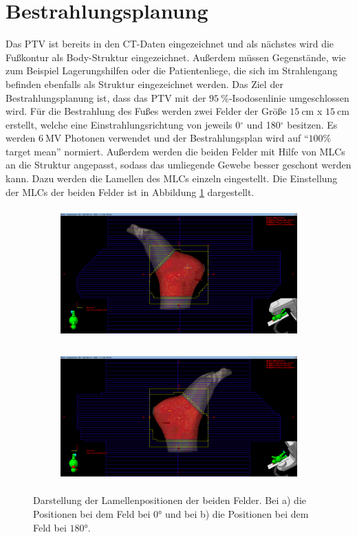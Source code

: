 \section{Bestrahlungsplanung}
\label{sec:Bestrahlungsplanung}
Das PTV ist bereits in den CT-Daten eingezeichnet und als nächstes wird die Fußkontur als Body-Struktur eingezeichnet.
Außerdem müssen Gegenstände, wie zum Beispiel Lagerungshilfen oder die Patientenliege, die sich im Strahlengang befinden
ebenfalls als Struktur eingezeichnet werden. Das Ziel der Bestrahlungsplanung ist, dass das PTV mit der
$\SI{95}{\percent}$-Isodosenlinie umgeschlossen wird.
Für die Bestrahlung des Fußes werden zwei Felder der Größe $\SI{15}{\centi\meter}$ x $\SI{15}{\centi\meter}$ erstellt,
welche eine Einstrahlungsrichtung von jeweils 0$^\circ$ und 180$^\circ$ besitzen.
Es werden $\SI{6}{\mega\volt}$ Photonen verwendet und der Bestrahlungsplan wird auf \enquote{$100\%$ target mean} normiert.
Außerdem werden die beiden Felder mit Hilfe von MLCs an die Struktur angepasst, sodass das umliegende Gewebe besser geschont werden kann.
Dazu werden die Lamellen des MLCs einzeln eingestellt.
Die Einstellung der MLCs der beiden Felder ist in Abbildung \ref{abb:MLC} dargestellt.

\begin{figure}[H]
  \centering
  \begin{subfigure}{\textwidth}
    \centering
    \includegraphics[height = 5cm]{Bilder/MLCFeld1.png}
    \caption{}
  \end{subfigure}
  \begin{subfigure}{\textwidth}
    \centering
    \includegraphics[height=5cm]{Bilder/MLCFeld2.png}
    \caption{}
  \end{subfigure}
  \caption{Darstellung der Lamellenpositionen der beiden Felder. Bei a) die Positionen bei dem Feld bei $0°$ und bei b) die Positionen bei dem Feld bei $180°$.}
  \label{abb:MLC}
\end{figure}
